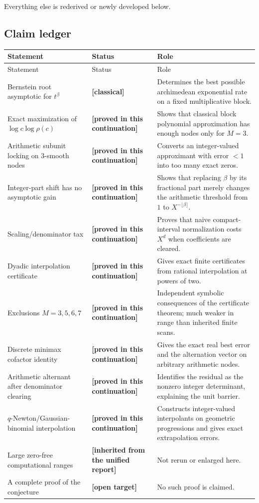 \documentclass[11pt,oneside]{article}
\theoremstyle{definition}
\theoremstyle{remark}
\newcommand{\statusnew}{\textcolor{proofgreen}{\textbf{[proved in this continuation]}}}
\newcommand{\statusclassical}{\textcolor{classicalgray}{\textbf{[classical]}}}
\newcommand{\statusinherited}{\textcolor{openblue}{\textbf{[inherited from the unified report]}}}
\newcommand{\statusopen}{\textcolor{openblue}{\textbf{[open target]}}}
\begin{document}
Everything else is rederived or newly developed below.

\subsection{Claim ledger}

\begin{longtable}{p{}p{}p{}}
\toprule
Statement & Status & Role \\
\midrule
\endfirsthead
\toprule
Statement & Status & Role \\
\midrule
\endhead
Bernstein root asymptotic for $t^\beta$ & \statusclassical & Determines the best possible
archimedean exponential rate on a fixed multiplicative block. \\
Exact maximization of $\log c\log\rho(c)$ & \statusnew & Shows that classical block
polynomial approximation has enough nodes only for $M=3$. \\
Arithmetic subunit locking on $3$-smooth nodes & \statusnew & Converts an
integer-valued approximant with error $<1$ into too many exact zeros. \\
Integer-part shift has no asymptotic gain & \statusnew & Shows that replacing $\beta$ by
its fractional part merely changes the arithmetic threshold from $1$ to $X^{-\lfloor\beta\rfloor}$. \\
Scaling/denominator tax & \statusnew & Proves that naive compact-interval
normalization costs $X^d$ when coefficients are cleared. \\
Dyadic interpolation certificate & \statusnew & Gives exact finite certificates from
rational interpolation at powers of two. \\
Exclusions $M=3,5,6,7$ & \statusnew & Independent symbolic consequences of the
certificate theorem; much weaker in range than inherited finite scans. \\
Discrete minimax cofactor identity & \statusnew & Gives the exact real best error and the
alternation vector on arbitrary arithmetic nodes. \\
Arithmetic alternant after denominator clearing & \statusnew & Identifies the residual
as the nonzero integer determinant, explaining the unit barrier. \\
$q$-Newton/Gaussian-binomial interpolation & \statusnew & Constructs integer-valued
interpolants on geometric progressions and gives exact extrapolation errors. \\
Large zero-free computational ranges & \statusinherited & Not rerun or enlarged here. \\
A complete proof of the conjecture & \statusopen & No such proof is claimed. \\
\bottomrule
\end{longtable}
\end{document}
